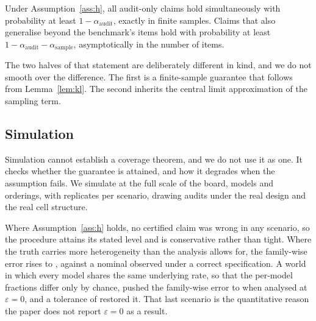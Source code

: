 \begin{proposition}[Coverage]
\label{prop:coverage}
Under Assumption~\ref{ass:h}, all audit-only claims hold simultaneously with probability at
least $1 - \alpha_{\mathrm{audit}}$, exactly in finite samples. Claims that also generalise
beyond the benchmark's items hold with probability at least
$1 - \alpha_{\mathrm{audit}} - \alpha_{\mathrm{sample}}$, asymptotically in the number of
items.
\end{proposition}

The two halves of that statement are deliberately different in kind, and we do not smooth over
the difference. The first is a finite-sample guarantee that follows from Lemma~\ref{lem:kl}.
The second inherits the central limit approximation of the sampling term.

\subsection{Simulation}

Simulation cannot establish a coverage theorem, and we do not use it as one. It checks
whether the guarantee is attained, and how it degrades when the assumption fails. We simulate
at the full scale of the board, \NumModels{} models and \NumOrderings{} orderings, with
\SimReplicates{} replicates per scenario, drawing audits under the real design and the real
cell structure.

Where Assumption~\ref{ass:h} holds, no certified claim was wrong in any scenario, so the
procedure attains its stated level and is conservative rather than tight. Where the truth
carries more heterogeneity than the analysis allows for, the family-wise error rises to
\SimFwerMisspecified{}, against a nominal \SimWorstFwerUnderH{} observed under a correct
specification. A world in which every model shares the same underlying rate, so that the
per-model fractions differ only by chance, pushed the family-wise error to
\SimFwerPropensityKTwo{} when analysed at $\varepsilon = 0$, and a tolerance of \EpsPrereg{}
restored it. That last scenario is the quantitative reason the paper does not report
$\varepsilon = 0$ as a result.
